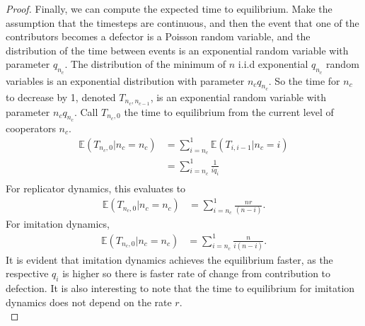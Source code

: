 \begin{proof}
Finally, we can compute the expected time to equilibrium. Make the assumption that the timesteps are continuous, and then the event that one of the contributors becomes a defector is a Poisson random variable, and the distribution of the time between events is an exponential random variable with parameter $q_{n_c}$. The distribution of the minimum of $n$ i.i.d exponential $q_{n_c}$ random variables is an exponential distribution with parameter $n_c q_{n_c}$. So the time for $n_c$ to decrease by 1, denoted $T_{{n_c},{n_{c-1}}}$, is an exponential random variable with parameter $n_c q_{n_c}$. Call $T_{n_c, 0}$ the time to equilibrium from the current level of cooperators $n_c$. 
\begin{align*}
    \mathbb E (T_{n_c, 0} | n_c = n_c) &= \sum_{i = n_c}^1 \mathbb E (T_{{i}, {i-1}}|n_c = i)\\
    &= \sum_{i = n_c}^1 \frac{1}{iq_i}\\
\end{align*}
For replicator dynamics, this evaluates to 
\begin{align*}
       \mathbb E (T_{n_c, 0} | n_c = n_c) &= \sum_{i = n_c}^1 \frac{nr}{(n-i)}. 
\end{align*}
For imitation dynamics, 
\begin{align*}
    \mathbb E (T_{n_c, 0} | n_c = n_c) &= \sum_{i = n_c}^1 \frac{n}{i(n-i)}. 
\end{align*}
It is evident that imitation dynamics achieves the equilibrium faster, as the respective $q_i$ is higher so there is faster rate of change from contribution to defection. It is also interesting to note that the time to equilibrium for imitation dynamics does not depend on the rate $r$. \\

\end{proof}



